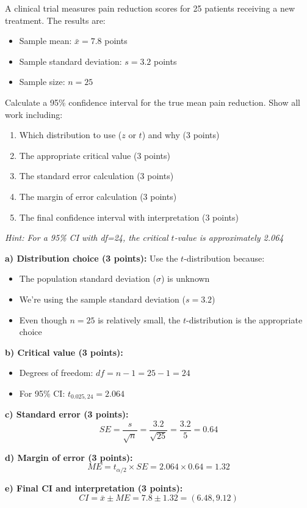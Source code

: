 \documentclass[11pt]{article}
\begin{document}
A clinical trial measures pain reduction scores for 25 patients receiving a new treatment. The results are:
\begin{itemize}
\item Sample mean: $\bar{x} = 7.8$ points
\item Sample standard deviation: $s = 3.2$ points
\item Sample size: $n = 25$
\end{itemize}

Calculate a 95\% confidence interval for the true mean pain reduction. Show all work including:
\begin{enumerate}[label=\alph*)]
\item Which distribution to use ($z$ or $t$) and why (3 points)
\item The appropriate critical value (3 points)
\item The standard error calculation (3 points)
\item The margin of error calculation (3 points)
\item The final confidence interval with interpretation (3 points)
\end{enumerate}

\textit{Hint: For a 95\% CI with df=24, the critical $t$-value is approximately 2.064}

\textbf{a) Distribution choice (3 points):} Use the $t$-distribution because:
\begin{itemize}
\item The population standard deviation ($\sigma$) is unknown
\item We're using the sample standard deviation ($s = 3.2$)
\item Even though $n = 25$ is relatively small, the $t$-distribution is the appropriate choice
\end{itemize}

\textbf{b) Critical value (3 points):}
\begin{itemize}
\item Degrees of freedom: $df = n - 1 = 25 - 1 = 24$
\item For 95\% CI: $t_{0.025, 24} = 2.064$
\end{itemize}

\textbf{c) Standard error (3 points):}
$$SE = \frac{s}{\sqrt{n}} = \frac{3.2}{\sqrt{25}} = \frac{3.2}{5} = 0.64$$

\textbf{d) Margin of error (3 points):}
$$ME = t_{\alpha/2} \times SE = 2.064 \times 0.64 = 1.32$$

\textbf{e) Final CI and interpretation (3 points):}
$$CI = \bar{x} \pm ME = 7.8 \pm 1.32 = (6.48, 9.12)$$
\end{document}
